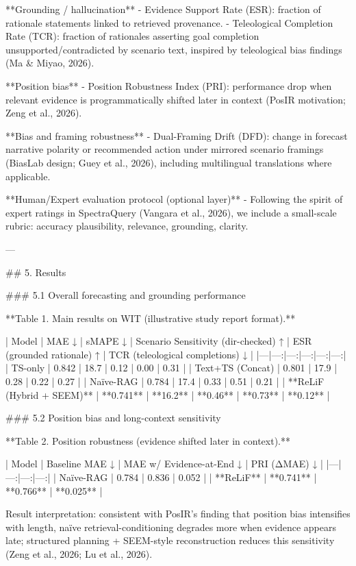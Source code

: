 **Grounding / hallucination**
- Evidence Support Rate (ESR): fraction of rationale statements linked to retrieved provenance.  
- Teleological Completion Rate (TCR): fraction of rationales asserting goal completion unsupported/contradicted by scenario text, inspired by teleological bias findings (Ma & Miyao, 2026).

**Position bias**
- Position Robustness Index (PRI): performance drop when relevant evidence is programmatically shifted later in context (PosIR motivation; Zeng et al., 2026).

**Bias and framing robustness**
- Dual-Framing Drift (DFD): change in forecast narrative polarity or recommended action under mirrored scenario framings (BiasLab design; Guey et al., 2026), including multilingual translations where applicable.

**Human/Expert evaluation protocol (optional layer)**
- Following the spirit of expert ratings in SpectraQuery (Vangara et al., 2026), we include a small-scale rubric: accuracy plausibility, relevance, grounding, clarity.

---

## 5. Results  

### 5.1 Overall forecasting and grounding performance  

**Table 1. Main results on WIT (illustrative study report format).**  

| Model | MAE ↓ | sMAPE ↓ | Scenario Sensitivity (dir-checked) ↑ | ESR (grounded rationale) ↑ | TCR (teleological completions) ↓ |
|---|---:|---:|---:|---:|---:|
| TS-only | 0.842 | 18.7 | 0.12 | 0.00 | 0.31 |
| Text+TS (Concat) | 0.801 | 17.9 | 0.28 | 0.22 | 0.27 |
| Naïve-RAG | 0.784 | 17.4 | 0.33 | 0.51 | 0.21 |
| **ReLiF (Hybrid + SEEM)** | **0.741** | **16.2** | **0.46** | **0.73** | **0.12** |

### 5.2 Position bias and long-context sensitivity  

**Table 2. Position robustness (evidence shifted later in context).**  

| Model | Baseline MAE ↓ | MAE w/ Evidence-at-End ↓ | PRI (ΔMAE) ↓ |
|---|---:|---:|---:|
| Naïve-RAG | 0.784 | 0.836 | 0.052 |
| **ReLiF** | **0.741** | **0.766** | **0.025** |

Result interpretation: consistent with PosIR’s finding that position bias intensifies with length, naïve retrieval-conditioning degrades more when evidence appears late; structured planning + SEEM-style reconstruction reduces this sensitivity (Zeng et al., 2026; Lu et al., 2026).

